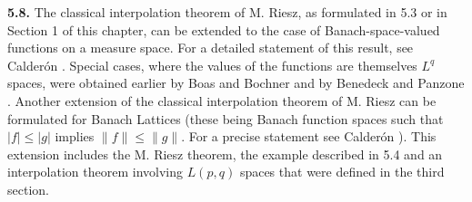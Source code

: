 \textbf{5.8.} The classical interpolation theorem of M. Riesz, as formulated
in 5.3 or in Section 1 of this chapter, can be extended to the case of
Banach-space-valued functions on a measure space. For a detailed statement of
this result, see Calder\'on \cite{Calderon2}. Special cases, where the values
of the functions are themselves $L^{q}$ spaces, were obtained earlier by Boas
and Bochner \cite{BoasBochner1} and by Benedeck and Panzone
\cite{BenedekPanzone1}. Another extension of the classical interpolation
theorem of M. Riesz can be formulated for Banach Lattices (these being Banach
function spaces such that $|f| \leq |g|$ implies $\|f\| \leq \|g\|$. For a
precise statement see Calder\'on \cite{Calderon2}). This extension includes the
M. Riesz theorem, the example described in 5.4 and an interpolation theorem
involving $L(p, q)$ spaces that were defined in the third section.

